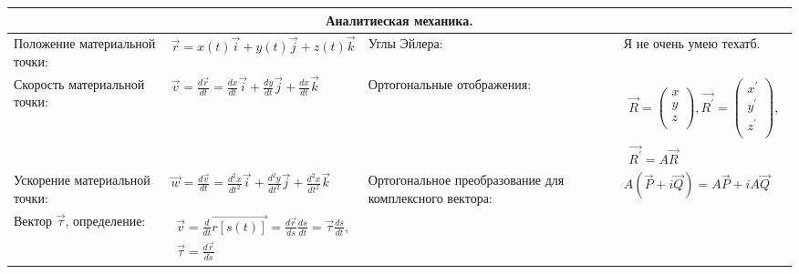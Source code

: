 \documentclass{article}
\begin{document}
\begin{tabular}{ |p{3.8cm}|p{5.7cm}|p{3.8cm}|p{5.7cm}|  }
\hline
\multicolumn{4}{|c|}{Аналитиеская механика.} \\
\hline
Положение материальной точки:                                                &  %
$\vec{r} = x(t) \vec{i} + y(t) \vec{j} + z(t) \vec{k}$                       &  %
Углы Эйлера:                                                                 &  %
Я не очень умею техатб.                                                      \\ %
\hline
Скорость материальной точки:                                                 &  %
$\vec{v} = \frac{d{\vec{r}}}{dt} =
\frac{dx}{dt} \vec{i} + \frac{dy}{dt} \vec{j} + \frac{dx}{dt} \vec{k}$       &  %
Ортогональные отображения:                                                   &  %
$\begin{aligned}
\vec{R} = 
\left(\begin{array}{c}
x \\
y \\
z \\
\end{array} \right),     
\vec{R^{'}} = 
\left(\begin{array}{c}
x^{'} \\
y^{'} \\
z^{'} \\
\end{array} \right),         \\
\vec{R^{'}} = A \vec{R}
\end{aligned}$                                                               \\ %
\hline
Ускорение материальной точки:                                                &  %
$\vec{w} = \frac{d{\vec{v}}}{dt} =
\frac{d^2 x}{dt^2} \vec{i} +
\frac{d^2 y}{dt^2} \vec{j} + \frac{d^2 x}{dt^2} \vec{k}$                     &  %
Ортогональное преобразование для комплексного вектора:                       &  %
$A (\vec{P} + i \vec{Q}) = A \vec{P} + i A \vec{Q}$                          \\ %
\hline
Вектор $\vec{\tau}$, определение:                                            &  %
$\begin{aligned}
\vec{v} = \frac{d}{dt} \vec{r[s(t)]} =                         
\frac{d\vec{r}}{ds} \frac{ds}{dt} = \vec{\tau} \frac{ds}{dt},   \\
\vec{\tau} = \frac{d\vec{r}}{ds}
\end{aligned}$                                                               &  %

\end{tabular}
\end{document}
